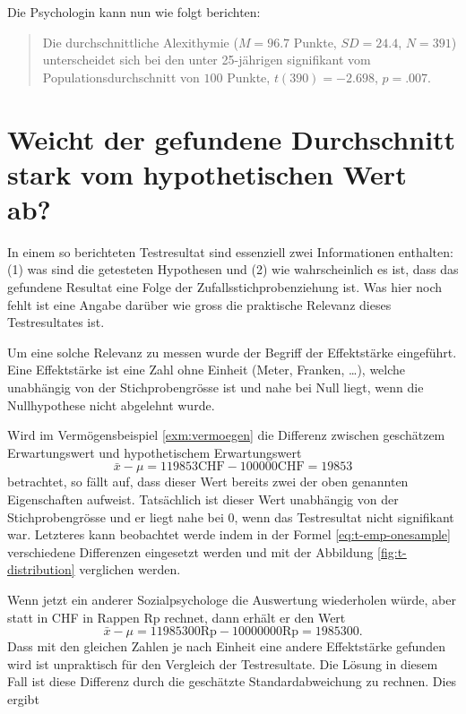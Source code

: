 \documentclass[
]{book}
\theoremstyle{definition}
\theoremstyle{definition}
\theoremstyle{definition}
\theoremstyle{definition}
\theoremstyle{remark}
\begin{document}
Die Psychologin kann nun wie folgt berichten:

\begin{quote}
Die durchschnittliche Alexithymie (\(M = 96.7\) Punkte, \(SD = 24.4\), \(N = 391\)) unterscheidet sich bei den unter 25-jährigen signifikant vom Populationsdurchschnitt von \(100\) Punkte, \(t(390) = -2.698\), \(p = .007\).
\end{quote}

\section{Weicht der gefundene Durchschnitt stark vom hypothetischen Wert ab?}\label{weicht-der-gefundene-durchschnitt-stark-vom-hypothetischen-wert-ab}

In einem so berichteten Testresultat sind essenziell zwei Informationen enthalten: (1) was sind die getesteten Hypothesen und (2) wie wahrscheinlich es ist, dass das gefundene Resultat eine Folge der Zufallsstichprobenziehung ist. Was hier noch fehlt ist eine Angabe darüber wie gross die praktische Relevanz dieses Testresultates ist.

Um eine solche Relevanz zu messen wurde der Begriff der Effektstärke eingeführt. Eine Effektstärke ist eine Zahl ohne Einheit (Meter, Franken, \ldots), welche unabhängig von der Stichprobengrösse ist und nahe bei Null liegt, wenn die Nullhypothese nicht abgelehnt wurde.

Wird im Vermögensbeispiel \ref{exm:vermoegen} die Differenz zwischen geschätzem Erwartungswert und hypothetischem Erwartungswert
\[\bar{x} - \mu = 119853 \text{CHF} - 100000 \text{CHF}  = 19853\]
betrachtet, so fällt auf, dass dieser Wert bereits zwei der oben genannten Eigenschaften aufweist. Tatsächlich ist dieser Wert unabhängig von der Stichprobengrösse und er liegt nahe bei \(0\), wenn das Testresultat nicht signifikant war. Letzteres kann beobachtet werde indem in der Formel \eqref{eq:t-emp-onesample} verschiedene Differenzen eingesetzt werden und mit der Abbildung \ref{fig:t-distribution} verglichen werden.

Wenn jetzt ein anderer Sozialpsychologe die Auswertung wiederholen würde, aber statt in CHF in Rappen Rp rechnet, dann erhält er den Wert
\[\bar{x} - \mu = 11985300 \text{Rp} - 10000000 \text{Rp}  = 1985300.\]
Dass mit den gleichen Zahlen je nach Einheit eine andere Effektstärke gefunden wird ist unpraktisch für den Vergleich der Testresultate. Die Lösung in diesem Fall ist diese Differenz durch die geschätzte Standardabweichung zu rechnen. Dies ergibt
\end{document}

